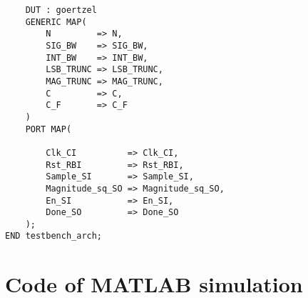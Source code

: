 \begin{lstlisting}
    DUT : goertzel
    GENERIC MAP(
        N         => N,
        SIG_BW    => SIG_BW,
        INT_BW    => INT_BW,
        LSB_TRUNC => LSB_TRUNC,
        MAG_TRUNC => MAG_TRUNC,
        C         => C,
        C_F       => C_F
    )
    PORT MAP(

        Clk_CI          => Clk_CI,
        Rst_RBI         => Rst_RBI,
        Sample_SI       => Sample_SI,
        Magnitude_sq_SO => Magnitude_sq_SO,
        En_SI           => En_SI,
        Done_SO         => Done_SO
    );
END testbench_arch;

\end{lstlisting}

\section{Code of MATLAB simulation}

